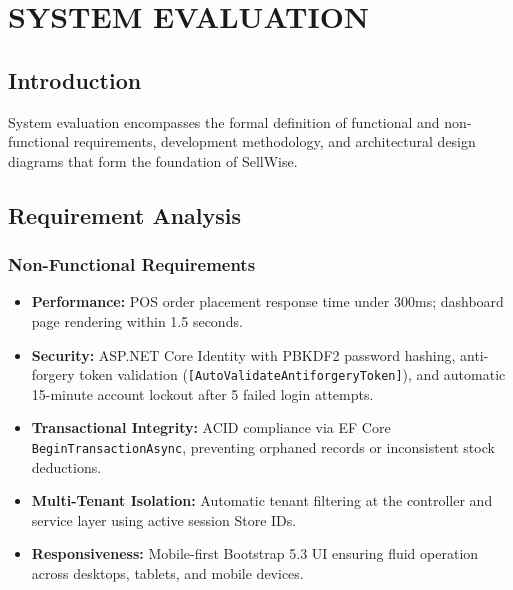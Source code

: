 \documentclass[12pt,a4paper]{report}
\begin{document}
\chapter{SYSTEM EVALUATION}

\section{Introduction}
System evaluation encompasses the formal definition of functional and non-functional requirements, development methodology, and architectural design diagrams that form the foundation of SellWise.

\section{Requirement Analysis}

\subsection{Non-Functional Requirements}
\begin{itemize}
    \item \textbf{Performance:} POS order placement response time under 300ms; dashboard page rendering within 1.5 seconds.
    \item \textbf{Security:} ASP.NET Core Identity with PBKDF2 password hashing, anti-forgery token validation (\texttt{[AutoValidateAntiforgeryToken]}), and automatic 15-minute account lockout after 5 failed login attempts.
    \item \textbf{Transactional Integrity:} ACID compliance via EF Core \texttt{BeginTransactionAsync}, preventing orphaned records or inconsistent stock deductions.
    \item \textbf{Multi-Tenant Isolation:} Automatic tenant filtering at the controller and service layer using active session Store IDs.
    \item \textbf{Responsiveness:} Mobile-first Bootstrap 5.3 UI ensuring fluid operation across desktops, tablets, and mobile devices.
\end{itemize}
\end{document}
